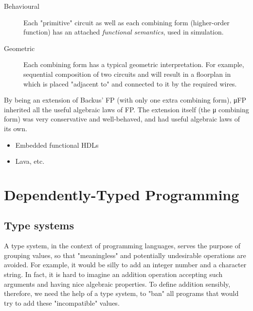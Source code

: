         \begin{description}
            \item[Behavioural]
                Each "primitive" circuit as well as each combining form (higher-order function)
                has an attached \emph{functional semantics}, used in simulation.
            \item[Geometric]
                Each combining form has a typical geometric interpretation.
                For example, sequential composition of two circuits  and  will result
                in a floorplan in which  is placed "adjacent to"  and connected to it
                by the required wires.
        \end{description}

        By being an extension of Backus' FP (with only one extra combining form),
        μFP inherited all the useful algebraic laws of FP.
        The extension itself (the μ combining form) was very conservative and well-behaved,
        and had useful algebraic laws of its own.


        \begin{itemize}
            \item Embedded functional HDLs
            \item Lava, etc.
        \end{itemize}


    \section{Dependently-Typed Programming}
    \label{sec:dtp}

        \subsection{Type systems}
        \label{subsec:type-systems}
            A type system, in the context of programming languages,
            serves the purpose of grouping values, so that "meaningless" and potentially undesirable operations are avoided.
            For example, it would be silly to add an integer number and a character string.
            In fact, it is hard to imagine an addition operation accepting such arguments and having nice algebraic properties.
            To define addition sensibly, therefore, we need the help of a type system,
            to "ban" all programs that would try to add these "incompatible" values.

